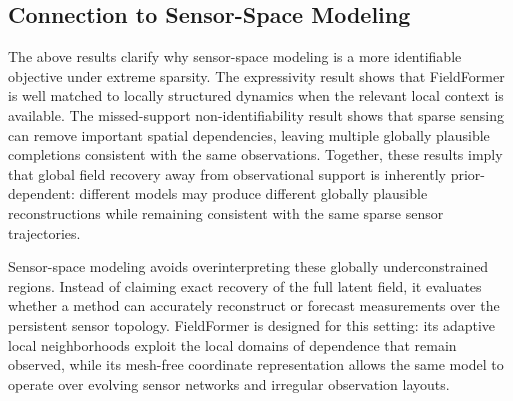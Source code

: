 \subsection{Connection to Sensor-Space Modeling}

The above results clarify why sensor-space modeling is a more identifiable objective under extreme sparsity. The expressivity result shows that FieldFormer is well matched to locally structured dynamics when the relevant local context is available. The missed-support non-identifiability result shows that sparse sensing can remove important spatial dependencies, leaving multiple globally plausible completions consistent with the same observations. Together, these results imply that global field recovery away from observational support is inherently prior-dependent: different models may produce different globally plausible reconstructions while remaining consistent with the same sparse sensor trajectories.

Sensor-space modeling avoids overinterpreting these globally underconstrained regions. Instead of claiming exact recovery of the full latent field, it evaluates whether a method can accurately reconstruct or forecast measurements over the persistent sensor topology. FieldFormer is designed for this setting: its adaptive local neighborhoods exploit the local domains of dependence that remain observed, while its mesh-free coordinate representation allows the same model to operate over evolving sensor networks and irregular observation layouts.

